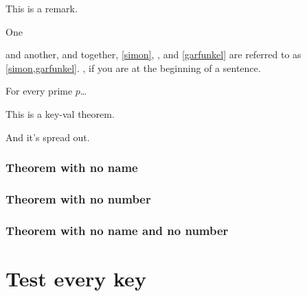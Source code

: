 \begin{remark}[name=AAA,label=abc]
This is a remark.
\end{remark}


\begin{callmeal}[Simon]\label{simon}
One
\end{callmeal}
\begin{callmeal}\label{garfunkel}
and another, and together,
\autoref{simon}, ,
and \cref{garfunkel} are referred
to as \cref{simon,garfunkel}.
, if you are at
the beginning of a sentence.
\end{callmeal}


\begin{styledtheorem}[Euclid]
For every prime $p$\dots
\end{styledtheorem}

\ifthmtools
\firsteuclid*
\else
{}
\fi

\begin{theorem}[name=Keyed theorem,
label=thm:key]
This is a
key-val theorem.
\end{theorem}
\begin{theorem}[continues=thm:key]
And it’s spread out.
\end{theorem}

\subsection{Theorem with no name}

\begin{noname}
\kant[2][1]
\end{noname}

\begin{noname}[heading]
\kant[2][1]
\end{noname}

\subsection{Theorem with no number}

\begin{euclid}
\kant[2][1]
\end{euclid}

\begin{euclid}[heading]
\kant[2][1]
\end{euclid}

\subsection{Theorem with no name and no number}

\begin{nonamenonumber}
\kant[2][1]
\end{nonamenonumber}

\begin{nonamenonumber}[heading]
\kant[2][1]
\end{nonamenonumber}

\chapter{Test every key}

\PrintTheorems

\listofkeytheorems
